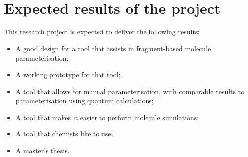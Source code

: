 \chapter[Expected results]{Expected results of the project}

This research project is expected to deliver the following results:
\begin{itemize}
\item A good design for a tool that assists in fragment-based molecule parameterisation;
\item A working prototype for that tool;
\item A tool that allows for manual parameterisation, with comparable results to parameterisation using quantum calculations;
\item A tool that makes it easier to perform molecule simulations;
\item A tool that chemists like to use;
\item A master's thesis.
\end{itemize}
